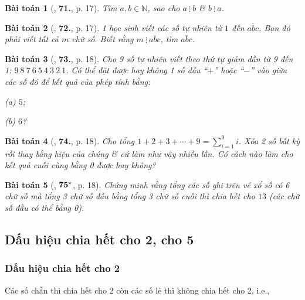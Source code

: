 \documentclass{article}
\numberwithin{equation}{section}
\newtheorem{baitoan}{Bài toán}[section]
\begin{document}
\begin{baitoan}[\cite{Binh_Toan_6_tap_1}, \textbf{71.}, p. 17]
	Tìm $a,b\in\mathbb{N}$, sao cho $a\ \vdots\ b$ \& $b\ \vdots\ a$.
\end{baitoan}

\begin{baitoan}[\cite{Binh_Toan_6_tap_1}, \textbf{72.}, p. 17]
	1 học sinh viết các số tự nhiên từ $1$ đến $\overline{abc}$. Bạn đó phải viết tất cả $m$ chữ số. Biết rằng $m\ \vdots\ \overline{abc}$, tìm $\overline{abc}$.
\end{baitoan}

\begin{baitoan}[\cite{Binh_Toan_6_tap_1}, \textbf{73.}, p. 18]
	Cho 9 số tự nhiên viết theo thứ tự giảm dần từ 9 đến 1: $9\ 8\ 7\ 6\ 5\ 4\ 3\ 2\ 1$. Có thể đặt được hay không 1 số dấu ``$+$'' hoặc ``$-$'' vào giữa các số đó để kết quả của phép tính bằng:
	\begin{enumerate*}
		\item[(a)] $5$;
		\item[(b)] $6$?
	\end{enumerate*}
\end{baitoan}

\begin{baitoan}[\cite{Binh_Toan_6_tap_1}, \textbf{74.}, p. 18]
	Cho tổng $1 + 2 + 3 + \cdots + 9 = \sum_{i=1}^9 i$. Xóa 2 số bất kỳ rồi thay bằng hiệu của chúng \& cứ làm như vậy nhiều lần. Có cách nào làm cho kết quả cuối cùng bằng 0 được hay không?
\end{baitoan}

\begin{baitoan}[\cite{Binh_Toan_6_tap_1}, $\bf 75^\star$, p. 18]
	Chứng minh rằng tổng các số ghi trên vé xổ số có 6 chữ số mà tổng 3 chữ số đầu bằng tổng 3 chữ số cuối thì chia hết cho $13$ (các chữ số đầu có thể bằng 0).
\end{baitoan}


\subsection{Dấu hiệu chia hết cho 2, cho 5}

\subsubsection{Dấu hiệu chia hết cho 2}
Các số chẵn thì chia hết cho 2 còn các số lẻ thì không chia hết cho 2, i.e.,
\end{document}
